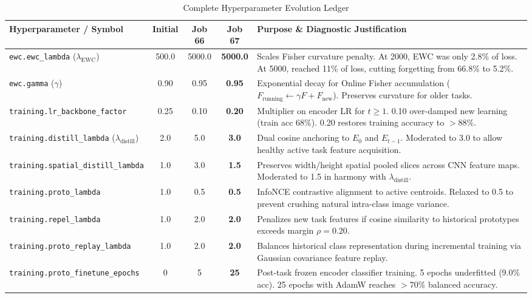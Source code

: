 \documentclass[11pt,a4paper]{article}
\begin{document}
    \begin{table}[h!]
    \centering
    \scriptsize
    \renewcommand{\arraystretch}{1.25}
    \caption{Complete Hyperparameter Evolution Ledger}
    \label{tab:hyperparameters-full}
    \begin{tabularx}{\textwidth}{p{3.2cm} c c c p{6.8cm}}
    \toprule
    \textbf{Hyperparameter / Symbol} & \textbf{Initial} & \textbf{Job 66} & \textbf{Job 67} & \textbf{Purpose \& Diagnostic Justification} \\
    \midrule
    \texttt{ewc.ewc\_lambda} ($\lambda_{\text{EWC}}$) & 500.0 & 5000.0 & \textbf{5000.0} & Scales Fisher curvature penalty. At 2000, EWC was only 2.8\% of loss. At 5000, reached 11\% of loss, cutting forgetting from 66.8\% to 5.2\%. \\
    \texttt{ewc.gamma} ($\gamma$) & 0.90 & 0.95 & \textbf{0.95} & Exponential decay for Online Fisher accumulation ($F_{\text{running}} \leftarrow \gamma F + F_{\text{new}}$). Preserves curvature for older tasks. \\
    \texttt{training.lr\_backbone\_factor} & 0.25 & 0.10 & \textbf{0.20} & Multiplier on encoder LR for $t \ge 1$. 0.10 over-damped new learning (train acc 68\%). 0.20 restores training accuracy to $>88\%$. \\
    \texttt{training.distill\_lambda} ($\lambda_{\text{distill}}$) & 2.0 & 5.0 & \textbf{3.0} & Dual cosine anchoring to $E_0$ and $E_{t-1}$. Moderated to 3.0 to allow healthy active task feature acquisition. \\
    \texttt{training.spatial\_distill\_lambda} & 1.0 & 3.0 & \textbf{1.5} & Preserves width/height spatial pooled slices across CNN feature maps. Moderated to 1.5 in harmony with $\lambda_{\text{distill}}$. \\
    \texttt{training.proto\_lambda} & 1.0 & 0.5 & \textbf{0.5} & InfoNCE contrastive alignment to active centroids. Relaxed to 0.5 to prevent crushing natural intra-class image variance. \\
    \texttt{training.repel\_lambda} & 1.0 & 2.0 & \textbf{2.0} & Penalizes new task features if cosine similarity to historical prototypes exceeds margin $\rho=0.20$. \\
    \texttt{training.proto\_replay\_lambda} & 1.0 & 2.0 & \textbf{2.0} & Balances historical class representation during incremental training via Gaussian covariance feature replay. \\
    \texttt{training.proto\_finetune\_epochs} & 0 & 5 & \textbf{25} & Post-task frozen encoder classifier training. 5 epochs underfitted (9.0\% acc). 25 epochs with AdamW reaches $>70\%$ balanced accuracy. \\

\end{tabularx}
\end{table}
\end{document}

